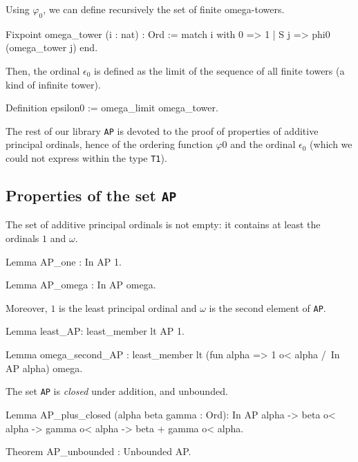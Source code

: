 {Using $\varphi_0$, we can define recursively the set of finite omega-towers.


\begin{Coqsrc}
Fixpoint omega_tower (i : nat) : Ord :=
  match i with
    0 =>  1
  | S j => phi0 (omega_tower j)
  end.
\end{Coqsrc}

Then, the ordinal  $\epsilon_0$ is defined as the limit of the sequence of all finite towers (a kind of infinite tower).

\begin{Coqsrc}
Definition epsilon0 := omega_limit omega_tower.
\end{Coqsrc}

The rest of our library \texttt{AP} is devoted to the proof of properties of additive principal ordinals, hence of the ordering function  $\varphi0$ and the ordinal $\epsilon_0$ (which we could not express within the type \texttt{T1}).

\subsection{Properties of the set  \texttt{AP}}

The set of additive principal ordinals is not empty: it contains at least the ordinals  $1$ and  $\omega$. 

\begin{Coqsrc}
Lemma AP_one : In AP 1.

Lemma AP_omega : In AP omega.
\end{Coqsrc}

Moreover, $1$ is the least principal ordinal and $\omega$ is the second element of
\texttt{AP}.


\begin{Coqsrc}
Lemma least_AP: least_member  lt AP 1. 

Lemma omega_second_AP :
  least_member   lt 
                  (fun alpha => 1 o< alpha /\ In AP alpha)
                  omega.
\end{Coqsrc}

The set  \texttt{AP} is  \emph{closed} under addition, and unbounded.

\begin{Coqsrc}
Lemma AP_plus_closed (alpha beta gamma : Ord): 
     In AP alpha -> beta o< alpha -> gamma o< alpha -> beta + gamma o< alpha.

Theorem AP_unbounded : Unbounded AP.
\end{Coqsrc}

}

